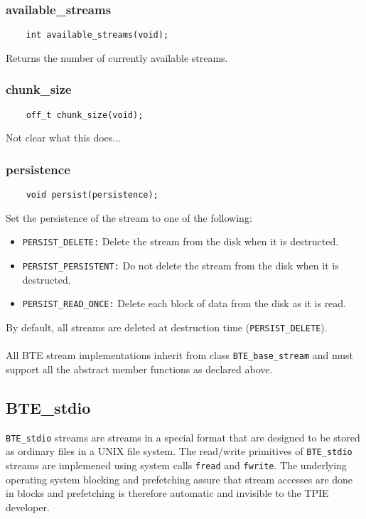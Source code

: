     
\subsubsection{available\_streams}
\begin{verbatim}
    int available_streams(void);    
\end{verbatim}
Returns the number of currently available streams.

\subsubsection{chunk\_size}
\begin{verbatim}
    off_t chunk_size(void);
\end{verbatim}
Not clear what this does...


\subsubsection{persistence}
\begin{verbatim}
    void persist(persistence);
\end{verbatim}
Set the persistence of the stream to one of the following:
\begin{itemize}
\item \verb|PERSIST_DELETE:| Delete the stream from the disk when it is
  destructed.
\item \verb|PERSIST_PERSISTENT:| Do not delete the stream from the disk when
  it is destructed.
\item \verb|PERSIST_READ_ONCE:| Delete each block of data from the disk as
  it is read.
\end{itemize}

By default, all streams are deleted at destruction time
(\verb|PERSIST_DELETE|).  
\\ \\
All BTE stream implementations inherit from class \verb|BTE_base_stream|
and must support all the abstract member functions as declared above.




\subsection{BTE\_stdio}

\verb|BTE_stdio| streams are streams in a special format that are designed
to be stored as ordinary files in a UNIX file system.  The read/write
primitives of \verb|BTE_stdio| streams are implemened using system calls
\verb|fread| and \verb|fwrite|. The underlying operating system blocking
and prefetching assure that stream accesses are done in blocks and
prefetching is therefore automatic and invisible to the TPIE developer.

